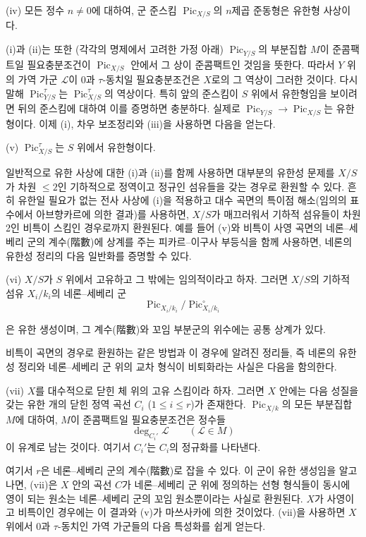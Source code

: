 \noindent(iv) 모든 정수 $n\neq0$에 대하여, 군 준스킴
$\operatorname{Pic}_{X/S}$의 $n$제곱 준동형은 유한형 사상이다.

(i)과 (ii)는 또한 (각각의 명제에서 고려한 가정 아래)
$\operatorname{Pic}_{Y/S}$의 부분집합 $M$이 준콤팩트일 필요충분조건이
$\operatorname{Pic}_{X/S}$ 안에서 그 상이 준콤팩트인 것임을 뜻한다.
따라서 $Y$ 위의 가역 가군 $\mathcal L$이 $0$과 $\tau$-동치일
필요충분조건은 $X$로의 그 역상이 그러한 것이다. 다시 말해
$\operatorname{Pic}_{Y/S}^\tau$는
$\operatorname{Pic}_{X/S}^\tau$의 역상이다. 특히 앞의 준스킴이 $S$
위에서 유한형임을 보이려면 뒤의 준스킴에 대하여 이를 증명하면 충분하다.
실제로 $\operatorname{Pic}_{Y/S}\longrightarrow
\operatorname{Pic}_{X/S}$는 유한형이다. 이제 (i), 차우 보조정리와
(iii)을 사용하면 다음을 얻는다.

\medskip
\noindent(v) $\operatorname{Pic}_{X/S}^\tau$는 $S$ 위에서 유한형이다.

일반적으로 유한 사상에 대한 (i)과 (ii)를 함께 사용하면 대부분의 유한성
문제를 $X/S$가 차원 $\leq2$인 기하적으로 정역이고 정규인 섬유들을 갖는
경우로 환원할 수 있다. 흔히 유한일 필요가 없는 전사 사상에 (i)을
적용하고 대수 곡면의 특이점 해소(임의의 표수에서 아브향카르에 의한
결과)를 사용하면, $X/S$가 매끄러워서 기하적 섬유들이 차원 2인
비특이 스킴인 경우로까지 환원된다. 예를 들어 (v)와 비특이 사영 곡면의
네론--세베리 군의 계수(階數)에 상계를 주는 피카르--이구사 부등식을
함께 사용하면, 네론의 유한성 정리의 다음 일반화를 증명할 수 있다.

\medskip
\noindent(vi) $X/S$가 $S$ 위에서 고유하고 그 밖에는 임의적이라고 하자.
그러면 $X/S$의 기하적 섬유 $X_i/k_i$의 네론--세베리 군
\[
\operatorname{Pic}_{X_i/k_i}/\operatorname{Pic}_{X_i/k_i}^\circ
\]

은 유한 생성이며, 그 계수(階數)와 꼬임 부분군의 위수에는 공통 상계가
있다.

비특이 곡면의 경우로 환원하는 같은 방법과 이 경우에 알려진 정리들, 즉
네론의 유한성 정리와 네론--세베리 군 위의 교차 형식이 비퇴화라는 사실은
다음을 함의한다.

\medskip
\noindent(vii) $X$를 대수적으로 닫힌 체 위의 고유 스킴이라 하자.
그러면 $X$ 안에는 다음 성질을 갖는 유한 개의 닫힌 정역 곡선
$C_i$ ($1\leq i\leq r$)가 존재한다. $\operatorname{Pic}_{X/k}$의
모든 부분집합 $M$에 대하여, $M$이 준콤팩트일 필요충분조건은 정수들
\[
\deg_{C_i'}\mathcal L\qquad(\mathcal L\in M)
\]
이 유계로 남는 것이다. 여기서 $C_i'$는 $C_i$의 정규화를 나타낸다.

여기서 $r$은 네론--세베리 군의 계수(階數)로 잡을 수 있다. 이 군이 유한
생성임을 알고 나면, (vii)은 $X$ 안의 곡선 $C$가 네론--세베리 군 위에
정의하는 선형 형식들이 동시에 영이 되는 원소는 네론--세베리 군의 꼬임
원소뿐이라는 사실로 환원된다. $X$가 사영이고 비특이인 경우에는 이 결과와
(v)가 마쓰사카에 의한 것이었다. (vii)을 사용하면 $X$ 위에서 $0$과
$\tau$-동치인 가역 가군들의 다음 특성화를 쉽게 얻는다.


